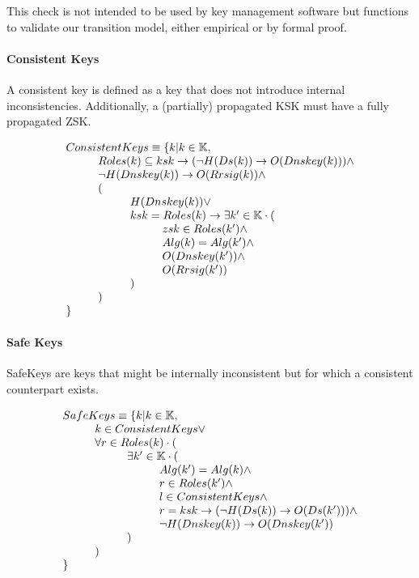 \documentclass[twoside,english, a4paper]{article}
\begin{document}
This check is not intended to be used by key management software but
functions to validate our transition model, either empirical or by 
formal proof.

\paragraph{Consistent Keys}
A consistent key is defined as a key that does not introduce 
internal inconsistencies. Additionally, a (partially) propagated KSK must have a fully
propagated ZSK.

\begin{displaymath}
\begin{array}{l}
ConsistentKeys \equiv \{ k | k\in\mathbb{K}, \\
\hskip 1cm	Roles(k) \subseteq {ksk} \rightarrow (\neg H(Ds(k)) \rightarrow O(Dnskey(k))) \wedge \\
\hskip 1cm	\neg H(Dnskey(k)) \rightarrow O(Rrsig(k)) \wedge \\
\hskip 1cm	( \\
\hskip 2cm		H(Dnskey(k)) \vee \\
\hskip 2cm		ksk=Roles(k) \rightarrow \exists k' \in \mathbb{K} \cdot (\\
\hskip 3cm			zsk \in Roles(k') \wedge \\
\hskip 3cm			Alg(k)=Alg(k') \wedge \\
\hskip 3cm			O(Dnskey(k')) \wedge \\
\hskip 3cm			O(Rrsig(k'))\\
\hskip 2cm		)\\
\hskip 1cm	)\\
\}
\end{array}
\end{displaymath}

\paragraph{Safe Keys}
SafeKeys are keys that might be internally inconsistent but for which
a consistent counterpart exists.

\begin{displaymath}
\begin{array}{l}
SafeKeys \equiv \{ k | k\in\mathbb{K}, \\
\hskip 1cm 		k \in ConsistentKeys \vee \\
\hskip 1cm 		\forall r \in Roles(k) \cdot ( \\
\hskip 2cm 			\exists k' \in \mathbb{K} \cdot ( \\
\hskip 3cm 				Alg(k') = Alg(k) \wedge \\
\hskip 3cm 				r \in Roles(k') \wedge \\
\hskip 3cm 				l \in ConsistentKeys \wedge \\
\hskip 3cm 				r = ksk \rightarrow (\neg H(Ds(k)) \rightarrow O(Ds(k'))) \wedge \\
\hskip 3cm 				\neg H(Dnskey(k)) \rightarrow O(Dnskey(k')) \\
\hskip 2cm 			)\\
\hskip 1cm 		)\\
\}
\end{array}
\end{displaymath}
\end{document}
